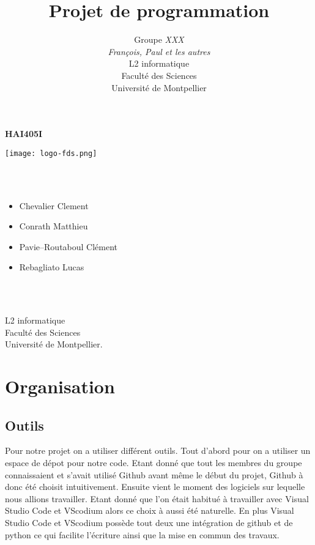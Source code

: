 \documentclass[a4paper, 12pt]{article}
\title{         %
  Projet de programmation}
\author{Groupe \emph{XXX}\\
  \emph{François, Paul et les autres}\\
    L2 informatique\\
  Faculté des Sciences\\
Université de Montpellier}
\begin{document}
\centerline{\Huge\bf HAI405I}
\vspace*{1.5cm}
\begin{center}               %
	
	
  \texttt{[image: logo-fds.png]}   %
	

\end{center}
\vspace*{1.5cm}


\vspace*{1.5cm}

\\ \\

\begin{itemize}\large
\item Chevalier Clement\large
\item Conrath Matthieu\large
\item Pavie--Routaboul Clément\large
\item Rebagliato Lucas\large
\end{itemize}
\\
\\
\vspace*{1.5cm}
\begin{center}
  L2 informatique\\
  Faculté des Sciences\\
Université de Montpellier.
\end{center}

\newpage

\section{Organisation}

\subsection{Outils}
Pour notre projet on a utiliser différent outils. Tout d'abord pour on a utiliser un espace de dépot pour notre code. Etant donné que tout les membres du groupe connaissaient et s'avait utilisé Github avant même le début du projet, Github à donc été choisit intuitivement. Ensuite vient le moment des logiciels sur lequelle nous allions travailler. Etant donné que l'on était habitué à travailler avec Visual Studio Code et VScodium alors ce choix à aussi été naturelle. En plus Visual Studio Code et VScodium possède tout deux une intégration de github et de python ce qui facilite l'écriture ainsi que la mise en commun des travaux.
\end{document}
